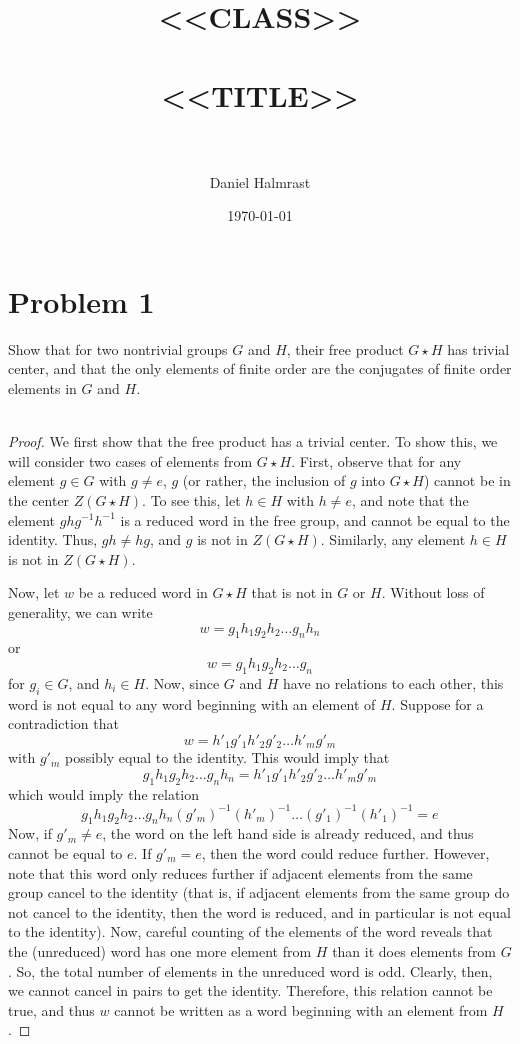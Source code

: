 \documentclass[fontsize=11pt]{scrartcl} %
\title{	
\normalfont \normalsize 
\textsc{<<CLASS>>} \\ [25pt] %
\horrule{0.5pt} \\[0.4cm] %
\huge <<TITLE>> \\ %
\horrule{2pt} \\[0.5cm] %
}
\author{Daniel Halmrast} %
\date{\normalsize\today} %
\numberwithin{equation}{section} %
\numberwithin{figure}{section} %
\numberwithin{table}{section} %
\begin{document}
\maketitle %

\section*{Problem 1}
Show that for two nontrivial groups $G$ and $H$, their free product $G\star H$
has trivial center, and that the only elements of finite order are the
conjugates of finite order elements in $G$ and $H$.
\\
\\
\begin{proof}
    We first show that the free product has a trivial center. To show this, we
    will consider two cases of elements from $G\star H$. First, observe
    that for any element $g\in G$ with $g\neq e$, $g$ (or rather, the inclusion
    of $g$ into $G\star H$) cannot be in the center $Z(G\star H)$. To see this,
    let $h\in H$ with $h\neq e$, and note that the element $ghg^{-1}h^{-1}$ is a
    reduced word in the free group, and cannot be equal to the identity. Thus,
    $gh\neq hg$, and $g$ is not in $Z(G\star H)$.  Similarly, any element $h\in
    H$ is not in $Z(G\star H)$.

    Now, let $w$ be a reduced word in $G\star H$ that is not in $G$ or $H$.
    Without loss of generality, we can write
    \[
        w = g_1h_1g_2h_2\dots g_nh_n
    \]
    or
    \[
        w = g_1h_1g_2h_2\dots g_n
    \]
    for $g_i\in G$, and $h_i\in H$. Now, since $G$ and $H$ have no relations to
    each other, this word is not equal to any word beginning with an element of
    $H$. Suppose for a contradiction that
    \[
        w = h'_1g'_1h'_2g'_2\dots h'_mg'_m
    \]
    with $g'_m$ possibly equal to the identity.
    This would imply that
    \[
        g_1h_1g_2h_2\dots g_nh_n = h'_1g'_1h'_2g'_2\dots h'_mg'_m
    \]
    which would imply the relation
    \[
        g_1h_1g_2h_2\dots g_nh_n(g'_m)^{-1}(h'_m)^{-1}\dots
        (g'_1)^{-1}(h'_1)^{-1} = e
    \]
    Now, if $g'_m\neq e$, the word on the left hand side is already reduced, and
    thus cannot be equal to $e$. If $g'_m=e$, then the word could reduce
    further. However, note that this word only reduces further if adjacent
    elements from the same group cancel to the identity (that is, if adjacent
        elements from the same group do not cancel to the identity, then
    the word is reduced, and in particular is not equal to the identity). Now,
    careful counting of the elements of the word reveals that the (unreduced)
    word has one more element from $H$ than it does elements from $G$. So, the
    total number of elements in the unreduced word is odd. Clearly, then, we
    cannot cancel in pairs to get the identity. 
    Therefore, this relation cannot be true, and thus $w$ cannot be written as a
    word beginning with an element from $H$.


\end{proof}
\end{document}
